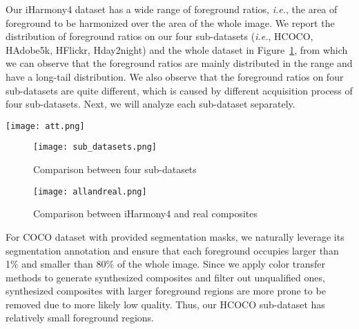 \documentclass[10pt,twocolumn,letterpaper]{article}
\begin{document}
Our iHarmony4 dataset has a wide range of foreground ratios, \emph{i.e.}, the area of foreground to be harmonized over the area of the whole image. We report the distribution of foreground ratios on our four sub-datasets (\emph{i.e.}, HCOCO, HAdobe5k, HFlickr, Hday2night) and the whole dataset in Figure~\ref{Fig:R1}, from which we can observe that the foreground ratios are mainly distributed in the range  and have a long-tail distribution. We also observe that the foreground ratios on four sub-datasets are quite different, which is caused by different acquisition process of four sub-datasets. Next, we will analyze each sub-dataset separately.

\begin{figure*}[tp!]
\begin{center}
\texttt{[image: att.png]}
\end{center}
   \caption{Illustration of our proposed attention module. (a). original U-Net structure without attention module; (b). U-Net with our attention module.}
\label{fig:att}
\end{figure*}

\begin{figure*}[hb]
	\centering
	\begin{subfigure}[t]{3in}
		\centering
		\texttt{[image: sub\_datasets.png]}
		\caption{Comparison between four sub-datasets}\label{Fig:R1}		
	\end{subfigure}
	\quad
	\begin{subfigure}[t]{3in}
		\centering
		\texttt{[image: allandreal.png]}
		\caption{Comparison between iHarmony4 and real composites}\label{Fig:R2}
	\end{subfigure}
	\caption{The distributions of foreground ratios. (a) Comparison between four sub-datasets shows that HCOCO and Hday2night have more images with small foreground regions while HAdobe5k and HFlickr have more images with large foreground regions. (b) Comparison between iHarmony4 and real composites in \cite{xue2012understandingsupp,tsai2017deepsupp} shows that the distribution of foreground ratios of iHarmony4 dataset is close to that of real composite images.}\label{fig:ratio}
\end{figure*}


For COCO dataset \cite{lin2014microsoftsupp} with provided segmentation masks, we naturally leverage its segmentation annotation and ensure that each foreground occupies larger than 1\% and smaller than 80\% of the whole image. Since we apply color transfer methods to generate synthesized composites and filter out unqualified ones, synthesized composites with larger foreground regions are more prone to be removed due to more likely low quality. Thus, our HCOCO sub-dataset has relatively small foreground regions.
\end{document}
